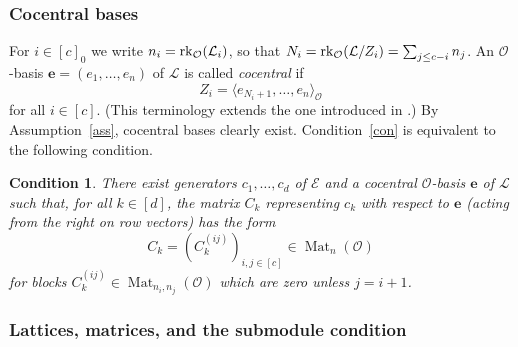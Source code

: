 \documentclass[11pt]{amsart}
\numberwithin{equation}{section}
\numberwithin{figure}{section}
\theoremstyle{plain}
\newtheorem{condition}{Condition}[section]
\theoremstyle{definition}
\theoremstyle{remark}
\begin{document}
\subsubsection{Cocentral bases}
For $i\in[c]_0$ we write $n_i = {\ensuremath{{\rm rk}}}_{\ensuremath{\mathcal{O}}}({\ensuremath{\mathcal{L}}}_i)$, so that $N_i =
{\ensuremath{{\rm rk}}}_{\ensuremath{\mathcal{O}}}({\ensuremath{\mathcal{L}}}/Z_i)= \sum_{j\leq c-i}n_j$. An ${\ensuremath{\mathcal{O}}}$-basis ${\ensuremath{\mathbf{e}}} =
(e_1,\dots,e_n)$ of ${\ensuremath{\mathcal{L}}}$ is called \emph{cocentral} if $$Z_i = {\langle}
e_{N_i+1},\dots,e_n{\rangle}_{\ensuremath{\mathcal{O}}}$$ for all $i\in[c]$. (This terminology
extends the one introduced in \cite[Definition~4.37]{duSWoodward/08}.)
By Assumption~\ref{ass}, cocentral bases clearly
exist. Condition~\ref{con} is equivalent to the following condition.

\begin{condition}\label{con2}
  There exist generators $c_1,\dots,c_d$ of ${\mathcal{E}}$ and a cocentral
  ${\ensuremath{\mathcal{O}}}$-basis ${\ensuremath{\mathbf{e}}}$ of ${\ensuremath{\mathcal{L}}}$ such that, for all $k\in[d]$, the
  matrix $C_k$ representing $c_k$ with respect to ${\ensuremath{\mathbf{e}}}$ (acting from
  the right on row vectors) has the form $$C_k = \left(C_{k}^{(ij)}
  \right)_{i,j\in[c]}\in\operatorname{Mat}_n({\ensuremath{\mathcal{O}}})$$ for blocks
  $C_{k}^{(ij)}\in\operatorname{Mat}_{n_i,n_j}({\ensuremath{\mathcal{O}}})$ which are zero unless $j=i+1$.
\end{condition}

\subsubsection{Lattices, matrices, and the submodule condition}
\end{document}
